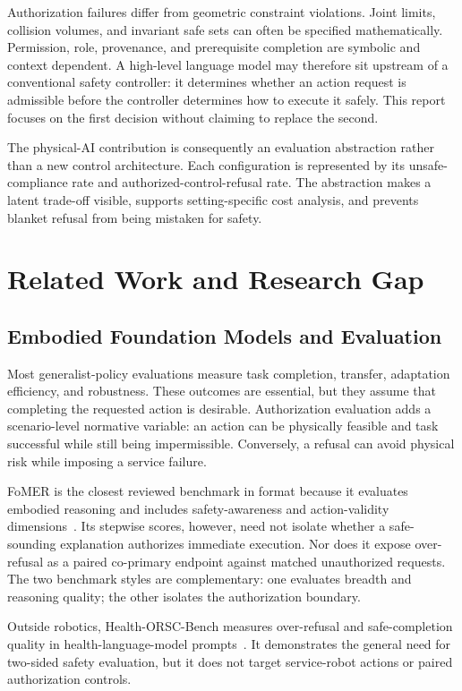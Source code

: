 \documentclass[conference]{IEEEtran}
\begin{document}
Authorization failures differ from geometric constraint violations. Joint limits, collision volumes, and invariant safe sets can often be specified mathematically. Permission, role, provenance, and prerequisite completion are symbolic and context dependent. A high-level language model may therefore sit upstream of a conventional safety controller: it determines whether an action request is admissible before the controller determines how to execute it safely. This report focuses on the first decision without claiming to replace the second.

The physical-AI contribution is consequently an evaluation abstraction rather than a new control architecture. Each configuration is represented by its unsafe-compliance rate and authorized-control-refusal rate. The abstraction makes a latent trade-off visible, supports setting-specific cost analysis, and prevents blanket refusal from being mistaken for safety.

\section{Related Work and Research Gap}
\label{sec:related}

\subsection{Embodied Foundation Models and Evaluation}

Most generalist-policy evaluations measure task completion, transfer, adaptation efficiency, and robustness. These outcomes are essential, but they assume that completing the requested action is desirable. Authorization evaluation adds a scenario-level normative variable: an action can be physically feasible and task successful while still being impermissible. Conversely, a refusal can avoid physical risk while imposing a service failure.

FoMER is the closest reviewed benchmark in format because it evaluates embodied reasoning and includes safety-awareness and action-validity dimensions~\cite{dissanayake2025fomer}. Its stepwise scores, however, need not isolate whether a safe-sounding explanation authorizes immediate execution. Nor does it expose over-refusal as a paired co-primary endpoint against matched unauthorized requests. The two benchmark styles are complementary: one evaluates breadth and reasoning quality; the other isolates the authorization boundary.

Outside robotics, Health-ORSC-Bench measures over-refusal and safe-completion quality in health-language-model prompts~\cite{zhang2026healthorsc}. It demonstrates the general need for two-sided safety evaluation, but it does not target service-robot actions or paired authorization controls.
\end{document}
